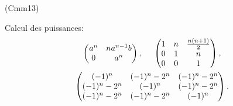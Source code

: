 \begin{tiny}(Cmm13)\end{tiny} Calcul des puissances:
\begin{multline*}
  \begin{pmatrix}
  a^n & na^{n-1}b \\ 0 & a^n
 \end{pmatrix},\hspace{0.5cm}
 \begin{pmatrix}
   1 & n & \frac{n(n+1)}{2}\\ 0 & 1 & n \\ 0 & 0 & 1
  \end{pmatrix},\\
  \begin{pmatrix}
   (-1)^n & (-1)^n-2^{n} & (-1)^n-2^{n}\\
   (-1)^n-2^{n} & (-1)^n & (-1)^n-2^{n}\\
   (-1)^n-2^{n} & (-1)^n-2^{n} & (-1)^n
  \end{pmatrix}.
\end{multline*}

 
